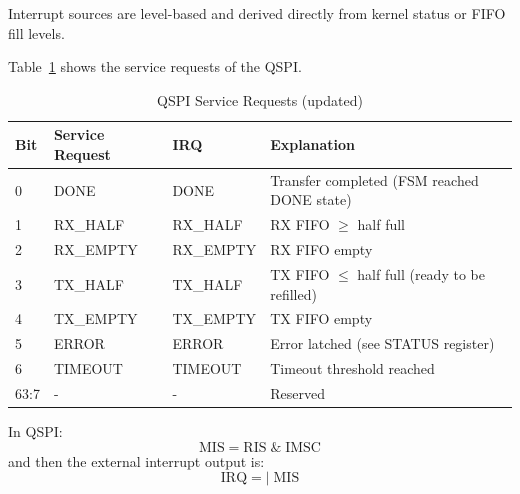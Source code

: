 Interrupt sources are level-based and derived directly from kernel status
or FIFO fill levels.

Table~\ref{tab:asQspiPer06c} shows the service requests of the QSPI.
\begin{table}[H]
\caption{QSPI Service Requests (updated)}
\label{tab:asQspiPer06c}
\centering
\begin{tabularx}{\textwidth}{|l |l |l |X|}
  \hline
  Bit & Service Request & IRQ & Explanation \\
  \hline
  \hline
  0 & DONE      & DONE      & Transfer completed (FSM reached DONE state) \\
  \hline
  1 & RX\_HALF  & RX\_HALF  & RX FIFO $\geq$ half full \\
  \hline
  2 & RX\_EMPTY & RX\_EMPTY & RX FIFO empty \\
  \hline
  3 & TX\_HALF  & TX\_HALF  & TX FIFO $\leq$ half full (ready to be refilled) \\
  \hline
  4 & TX\_EMPTY & TX\_EMPTY & TX FIFO empty \\
  \hline
  5 & ERROR     & ERROR     & Error latched (see STATUS register) \\
  \hline
  6 & TIMEOUT   & TIMEOUT   & Timeout threshold reached \\
  \hline
  63:7 & -       & -         & Reserved \\
  \hline
\end{tabularx}
\end{table}

In QSPI: \[ \text{MIS} = \text{RIS} \;\&\; \text{IMSC} \]
and then the external interrupt output is: \[ \text{IRQ} = |\;\text{MIS} \]
